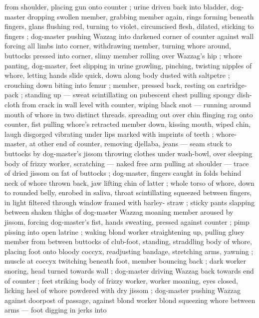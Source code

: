 from shoulder, placing gun onto counter ; urine driven back into 
bladder, dog-master dropping swollen member, grabbing member 
again, rings forming beneath fingers, glans flushing red, turning to 
violet, circumcised flesh, dilated, sticking to fingers ; dog-master 
pushing Wazzag into darkened corner of counter against wall 
forcing all limbs into corner, withdrawing member, turning whore 
around, buttocks pressed into corner, slimy member rolling over 
Wazzag's hip ; whore panting, dog-master, feet slipping in urine 
growling, pinching, twisting nipples of whore, letting hands slide 
quick, down along body dusted with saltpetre ; crouching down 
biting into femur ; member, pressed back, resting on cartridge-pack 
; standing up --- sweat scintillating on pubescent chest {\dashcom} pulling 
spongy dish-cloth from crack in wall level with counter, wiping black 
snot --- running around mouth of whore in two distinct threads. 
spreading out over chin {\dashcom} flinging rag onto counter, fist pulling 
whore's retracted member down, kissing mouth, wiped chin, laugh 
disgorged vibrating under lips marked with imprints of teeth ; whore- 
master, at other end of counter, removing djellaba, jeans --- seam 
stuck to buttocks by dog-master's jissom {\dashcom} throwing clothes under 
wash-bowl, over sleeping body of frizzy worker, scratching --- naked 
free arm pulling at shoulder --- trace of dried jissom on fat of 
buttocks ; dog-master, fingers caught in folds behind neck of whore 
thrown back, jaw lifting chin of latter ; whole torso of whore, down to 
rounded belly, enrobed in saliva, throat scintillating squeezed 
between fingers, in light filtered through window framed with barley- 
straw ; sticky pants slapping between shaken thighs of dog-master 
Wazzag moaning {\col} member aroused by jissom, forcing dog-master's 
fist, hands sweating, pressed against counter ; pimp pissing into 
open latrine ; waking blond worker {\col} straightening up, pulling gluey 
member from between buttocks of club-foot, standing, straddling 
body of whore, placing foot onto bloody coccyx, readjusting 
bandage, stretching arms, yawning ; muscle at coccyx twitching 
beneath foot, member bouncing back ; dark worker snoring, head 
turned towards wall ; dog-master driving Wazzag back towards end 
of counter ; feet striking body of frizzy worker, worker moaning, eyes 
closed, licking heel of whore powdered with dry jissom ; dog-master 
pushing Wazzag against doorpost of passage, against blond worker 
{\col} blond squeezing whore between arms --- foot digging in jerks into 
